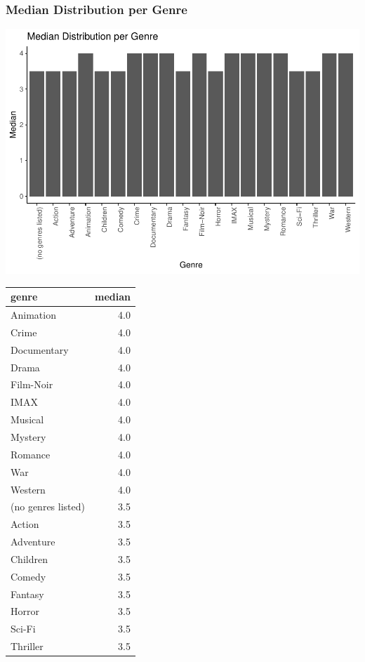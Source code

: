 \documentclass[
]{article}
\begin{document}
\hypertarget{median-distribution-per-genre}{%
\subsubsection{Median Distribution per
Genre}\label{median-distribution-per-genre}}

\begin{center}\includegraphics{MovieLens-Project-Report_files/figure-latex/unnamed-chunk-30-1} \end{center}

\begin{table}
\centering\begingroup\fontsize{10}{12}\selectfont

\begin{tabular}{l|r}
\hline
genre & median\\
\hline
Animation & 4.0\\
\hline
Crime & 4.0\\
\hline
Documentary & 4.0\\
\hline
Drama & 4.0\\
\hline
Film-Noir & 4.0\\
\hline
IMAX & 4.0\\
\hline
Musical & 4.0\\
\hline
Mystery & 4.0\\
\hline
Romance & 4.0\\
\hline
War & 4.0\\
\hline
Western & 4.0\\
\hline
(no genres listed) & 3.5\\
\hline
Action & 3.5\\
\hline
Adventure & 3.5\\
\hline
Children & 3.5\\
\hline
Comedy & 3.5\\
\hline
Fantasy & 3.5\\
\hline
Horror & 3.5\\
\hline
Sci-Fi & 3.5\\
\hline
Thriller & 3.5\\
\hline
\end{tabular}
\endgroup{}
\end{table}
\end{document}
